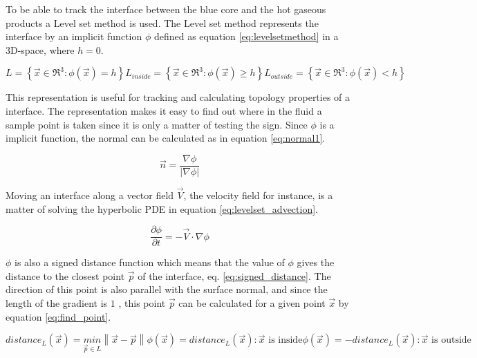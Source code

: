 To be able to track the interface between the blue core and the hot gaseous products a Level set method is used. The Level set method represents the interface by an implicit function $\phi$ defined as equation \ref{eq:levelsetmethod} in a 3D-space, where $h = 0$. 

\begin{subequations}
\label{eq:levelsetmethod}
\begin{equation}
 L = \left \{ \vec{x} \in \Re^3 : \phi(\vec{x}) = h  \right \}
\end{equation}    
\begin{equation}
  L_{inside} = \left \{ \vec{x} \in \Re^3 : \phi(\vec{x}) \geq h  \right \}
\end{equation}
\begin{equation}
  L_{outside} = \left \{ \vec{x} \in \Re^3 : \phi(\vec{x}) <  h  \right \}
\end{equation}
\end{subequations}

This representation is useful for tracking and calculating topology properties of a interface. The representation makes it easy to find out where in the fluid a sample point is taken since it is only a matter of testing the sign. Since $\phi$ is a implicit function, the normal can be calculated as in equation \ref{eq:normal1}.

\begin{equation}
\label{eq:normal1}
 \vec{n} = \frac{ \nabla \phi }{ \left | \nabla \phi \right | }
\end{equation}    

Moving an interface along a vector field $\vec{V}$, the velocity field for instance, is a matter of solving the hyperbolic PDE in equation \ref{eq:levelset_advection}.

 \begin{equation}
\label{eq:levelset_advection}
  \frac{\partial \phi}{\partial t} = -\vec{V} \cdot \nabla \phi
\end{equation}  

$\phi$ is also a signed distance function which means that the value of $\phi$ gives the distance to the closest point $\vec{p}$ of the interface, eq. \ref{eq:signed_distance}. The direction of this point is also parallel with the surface normal, and since the length of the gradient is $1$ \cite{bridson}, this point $\vec{p}$ can be calculated for a given point $\vec{x}$ by equation \ref{eq:find_point}.

\begin{subequations}
\label{eq:signed_distance}
\begin{equation}
distance_L(\vec{x}) = \underset{\vec{p} \in L}{min} \left \| \vec{x} - \vec{p} \right \|
\end{equation}    
\begin{equation}
\phi(\vec{x}) = distance_L(\vec{x}) : \vec{x} \text{ is inside}
\end{equation}
\begin{equation}
\phi(\vec{x}) = -distance_L(\vec{x}) : \vec{x} \text{ is outside}
\end{equation}
\end{subequations}

